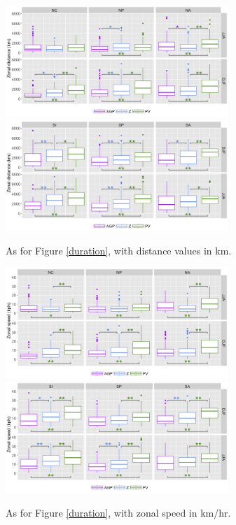 \documentclass[smallextended]{svjour3}       %
\numberwithin{equation}{section}
\begin{document}
\begin{figure}
    \centering
    \includegraphics[width=0.75\textwidth]{fig_distance_NH.png}
    \includegraphics[width=0.75\textwidth]{fig_distance_SH.png}
    \caption{As for Figure \ref{duration}, with distance values in km.}
    \label{dist}
\end{figure}

\begin{figure}
    \centering
    \includegraphics[width=0.75\textwidth]{fig_speed_NH.png}
        \includegraphics[width=0.75\textwidth]{fig_speed_SH.png}
    \caption{As for Figure \ref{duration}, with zonal speed in km/hr.}
    \label{shspeed}
\end{figure}
\end{document}
